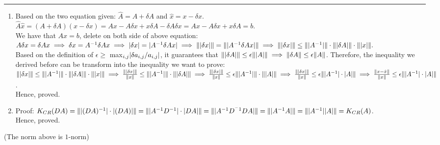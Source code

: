 \documentclass[11pt]{article}
\begin{document}





\begin{quote}

\end{quote}
\hrule


\begin{solution}
\item
\begin{enumerate}
    \item 
    Based on the two equation given: $\hat{A} = A + \delta A $ and $\hat{x} = x - \delta x$. \\
    $\hat{A}\hat{x} = (A  + \delta A)(x -  \delta x) = Ax - A\delta x + x\delta A - \delta A \delta x = Ax - A\delta x + x\delta A = b $. \\
    We have that $Ax = b$, delete on both side of above equation:\\
    $ A\delta x = \delta A x \implies \delta x = A^{-1}\delta A x \implies \abs{\delta x} = \abs{A^{-1}\delta A x} \implies \norm {\abs{\delta x}} = \norm {\abs{A^{-1}\delta A x}} \implies \norm {\abs{\delta x}} \leq \norm{\abs{A^{-1}}} \cdot  \norm{\abs{\delta A}} \cdot \norm{\abs{x}}. $\\
    Based on the definition of $\epsilon \geq$ max$_{i,j} \abs{\delta a_{i,j}/ a_{i,j}}$, it guarantees that $\norm {\abs {\delta A}} \leq \epsilon \norm{\abs{A}} \implies \norm {\delta A} \leq \epsilon \norm{A}$.
    Therefore, the inequality we derived before can be transform into the inequality we want to prove:\\
    $\norm {\abs{\delta x}} \leq \norm{\abs{A^{-1}}} \cdot  \norm{\abs{\delta A}} \cdot \norm{\abs{x}} \implies \frac{\norm {\abs{\delta x}}}{\norm{x}}\leq \norm{\abs{A^{-1}}} \cdot  \norm{\abs{\delta A}} \implies \frac{\norm {\abs{\delta x}}}{\norm{x}}\leq \epsilon \norm{\abs{A^{-1}}} \cdot  \norm{\abs{A}} \implies \frac{\norm {\abs{\delta x}}}{\norm{x}}\leq \epsilon \norm{\abs{A^{-1}} \cdot \abs{A}} \implies \frac{\norm {x - \hat{x}}}{\norm{x}}\leq \epsilon \norm{\abs{A^{-1}} \cdot \abs{A}}$.\\
    Hence, proved.
    
    
    \item Proof:
    \newline
        $K_{CR}(DA) = \norm{ \abs{(DA)^{-1}} \cdot \abs{(DA)} } = \norm { \abs{A^{-1}D^{-1}} \cdot \abs{DA}} = \norm {\abs{A^{-1}D^{^-1}DA}} = \norm {\abs {A^{-1}A}} = \norm {\abs {A^{-1}} \abs A } = K_{CR}(A)$.\\
        Hence, proved.
        
    \end{enumerate}
    (The norm above is $1$-norm)
\end{solution}
\end{document}
